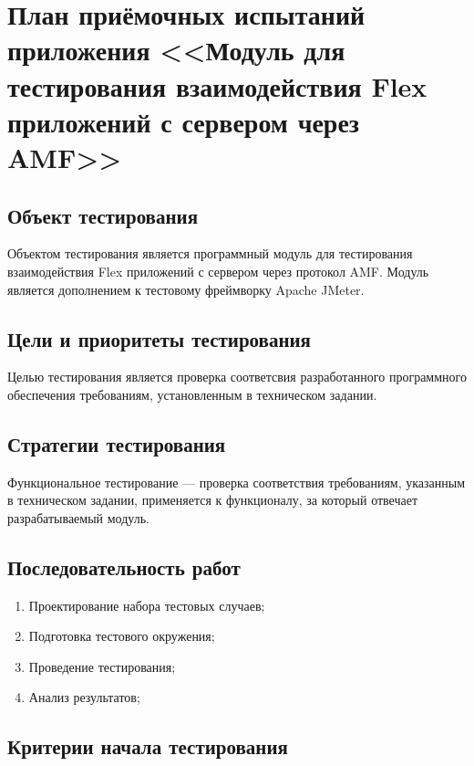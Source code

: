 \chapter{План приёмочных испытаний приложения <<Модуль для тестирования взаимодействия Flex приложений с сервером через AMF>>}
\label{cha:appendix2}

\section{Объект тестирования}

Объектом тестирования является программный модуль для тестирования взаимодействия Flex приложений с сервером через
протокол AMF. Модуль является дополнением к тестовому фреймворку Apache JMeter.

\section{Цели и приоритеты тестирования}

Целью тестирования является проверка соответсвия разработанного программного обеспечения требованиям, установленным
в техническом задании.

\section{Стратегии тестирования}

Функциональное тестирование --- проверка соответствия требованиям, указанным в техническом задании,
применяется к функционалу, за который отвечает разрабатываемый модуль.

\section{Последовательность работ}

\begin{enumerate}
\item Проектирование набора тестовых случаев;
\item Подготовка тестового окружения;
\item Проведение тестирования;
\item Анализ результатов;
\end{enumerate}

\section{Критерии начала тестирования}

